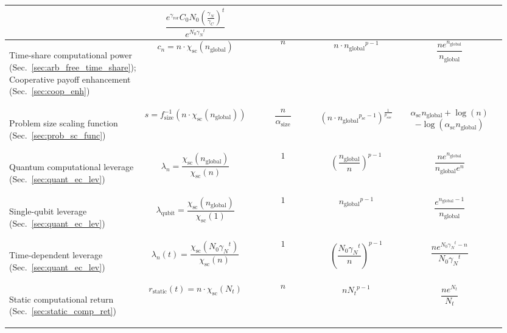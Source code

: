 \begin{table}[!htbp]
{\begin{tabular}{|m{0.21\linewidth}|m{0.21\linewidth}|m{0.15\linewidth}|m{0.155\linewidth}|m{0.225\linewidth}|}
\[\] & \[ \frac{e^{\gamma_\mathrm{ror}} C_0N_0 \left(\frac{\gamma_N}{\gamma_C}\right)^t}{e^{N_0 {\gamma_N}^t}}\] \\
	\hline
	\begin{flushleft}Time-share computational power (Sec.~\ref{sec:arb_free_time_share}); Cooperative payoff enhancement (Sec.~\ref{sec:coop_enh})\end{flushleft} & \[c_n=n \cdot \chi_\mathrm{sc}(n_\mathrm{global})
\] & \[n\] & \[n\cdot{n_\mathrm{global}}^{p-1}\] & \[\frac{n e^{n_\mathrm{global}}}{n_\mathrm{global}}\]\\
	\hline
	\begin{flushleft}Problem size scaling function (Sec.~\ref{sec:prob_sc_func})\end{flushleft} & \[s = f_\mathrm{size}^{-1}(n\cdot \chi_\mathrm{sc}(n_\mathrm{global}))\] & \[\frac{n}{\alpha_\mathrm{size}}\] & \[(n \cdot {n_\mathrm{global}}^{p_\mathrm{sc}-1})^\frac{1}{p_\mathrm{size}}\] & \[\alpha_\mathrm{sc}n_\mathrm{global} + \log(n)\]\[-\log(\alpha_\mathrm{sc}n_\mathrm{global})\] \\
	\hline
	\begin{flushleft}Quantum computational leverage (Sec.~\ref{sec:quant_ec_lev})\end{flushleft} & \[\lambda_n=\frac{\chi_\mathrm{sc}(n_\mathrm{global})}{\chi_\mathrm{sc}(n)}\] & \[1\] & \[\left(\frac{n_\mathrm{global}}{n}\right)^{p-1}\] & \[\frac{n e^{n_\mathrm{global}}}{n_\mathrm{global}e^n}\]\\
	\hline
	\begin{flushleft}Single-qubit leverage (Sec.~\ref{sec:quant_ec_lev})\end{flushleft} & \[\lambda_\mathrm{qubit}=\frac{\chi_\mathrm{sc}(n_\mathrm{global})}{\chi_\mathrm{sc}(1)}\] & \[1\] & \[{n_\mathrm{global}}^{p-1}\] & \[\frac{e^{n_\mathrm{global}-1}}{n_\mathrm{global}}\]\\
	\hline
	\begin{flushleft}Time-dependent leverage (Sec.~\ref{sec:quant_ec_lev})\end{flushleft} & \[\lambda_n(t)=\frac{\chi_\mathrm{sc}(N_0{\gamma_N}^t)}{\chi_\mathrm{sc}(n)}\] &  \[1\] & \[\left(\frac{N_0{\gamma_N}^t}{n}\right)^{p-1}\] & \[\frac{n e^{N_0{\gamma_N}^t-n}}{N_0{\gamma_N}^t}\]\\
	\hline
	\begin{flushleft}Static computational return (Sec.~\ref{sec:static_comp_ret})\end{flushleft} & \[r_\mathrm{static}(t) = n\cdot\chi_\mathrm{sc}(N_t)\] & \[n\] & \[n{N_t}^{p-1}\] & \[\frac{n e^{N_t}}{N_t}\] \\

\end{tabular}}
\end{table}
